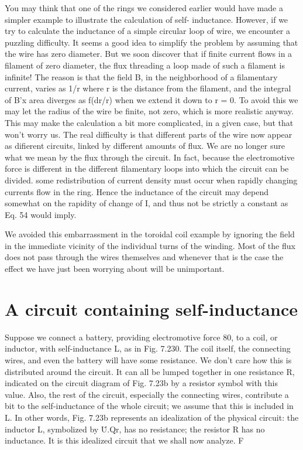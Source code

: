 You may think that one of the rings we considered earlier would
have made a simpler example to illustrate the calculation of self-
inductance. However, if we try to calculate the inductance of a
simple circular loop of wire, we encounter a puzzling difficulty. It
seems a good idea to simplify the problem by assuming that the wire
has zero diameter. But we soon discover that if finite current flows
in a filament of zero diameter, the flux threading a loop made of such
a filament is infinite! The reason is that the field B, in the neighborhood
of a filamentary current, varies as 1/r where r is the distance
from the filament, and the integral of B'x area diverges as f(dr/r)
when we extend it down to r = 0. To avoid this we may let the radius
of the wire be finite, not zero, which is more realistic anyway. This
may make the calculation a bit more complicated, in a given case,
but that won't worry us. The real difficulty is that different parts of
the wire now appear as difierent circuits, linked by different amounts
of flux. We are no longer sure what we mean by the flux through the
circuit. In fact, because the electromotive force is different in the
different filamentary loops into which the circuit can be divided. some
redistribution of current density must occur when rapidly changing
currents flow in the ring. Hence the inductance of the circuit may
depend somewhat on the rapidity of change of I, and thus not be
strictly a constant as Eq. 54 would imply.

We avoided this embarrassment in the toroidal coil example by
ignoring the field in the immediate vicinity of the individual turns of
the winding. Most of the flux does not pass through the wires themselves
and whenever that is the case the effect we have just been
worrying about will be unimportant.

\section{A circuit containing self-inductance}

Suppose we connect a battery, providing electromotive force 80,
to a coil, or inductor, with self-inductance L, as in Fig. 7.230. The
coil itself, the connecting wires, and even the battery will have some
resistance. We don't care how this is distributed around the circuit.
It can all be lumped together in one resistance R, indicated on the
circuit diagram of Fig. 7.23b by a resistor symbol with this value.
Also, the rest of the circuit, especially the connecting wires, contribute
a bit to the self-inductance of the whole circuit; we assume that
this is included in L. In other words, Fig. 7.23b represents an
idealization of the physical circuit: the inductor L, symbolized by
\.U.Qr, has no resistance; the resistor R has no inductance. It is
this idealized circuit that we shall now analyze. F

